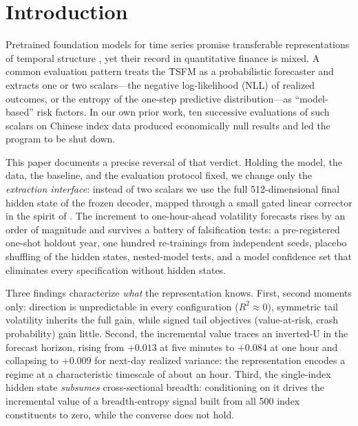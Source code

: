\documentclass[12pt]{article}
\begin{document}
\section{Introduction}
Pretrained foundation models for time series promise transferable
representations of temporal structure \citep{das2024timesfm,ansari2024chronos,
shi2025kronos}, yet their record in quantitative finance is mixed. A common
evaluation pattern treats the TSFM as a probabilistic forecaster and extracts
one or two scalars---the negative log-likelihood (NLL) of realized outcomes, or
the entropy of the one-step predictive distribution---as ``model-based'' risk
factors. In our own prior work, ten successive evaluations of such scalars on
Chinese index data produced economically null results and led the program to be
shut down.

This paper documents a precise reversal of that verdict. Holding the model, the
data, the baseline, and the evaluation protocol fixed, we change only the
\emph{extraction interface}: instead of two scalars we use the full
512-dimensional final hidden state of the frozen decoder, mapped through a
small gated linear corrector in the spirit of \citet{dewage2026hybrid}. The
increment to one-hour-ahead volatility forecasts rises by an order of
magnitude and survives a battery of falsification tests: a pre-registered
one-shot holdout year, one hundred re-trainings from independent seeds, placebo
shuffling of the hidden states, nested-model \citet{clark2007cw} tests, and a
model confidence set \citep{hansen2011mcs} that eliminates every specification
without hidden states.

Three findings characterize \emph{what} the representation knows. First,
second moments only: direction is unpredictable in every configuration
($R^2 \approx 0$), symmetric tail volatility inherits the full gain, while
signed tail objectives (value-at-risk, crash probability) gain little. Second,
the incremental value traces an inverted-U in the forecast horizon, rising from
$+0.013$ at five minutes to $+0.084$ at one hour and collapsing to $+0.009$ for
next-day realized variance: the representation encodes a regime at a
characteristic timescale of about an hour. Third, the
single-index hidden state \emph{subsumes} cross-sectional breadth:
conditioning on it drives the incremental value of a breadth-entropy signal
built from all 500 index constituents to zero, while the converse does not
hold.
\end{document}
